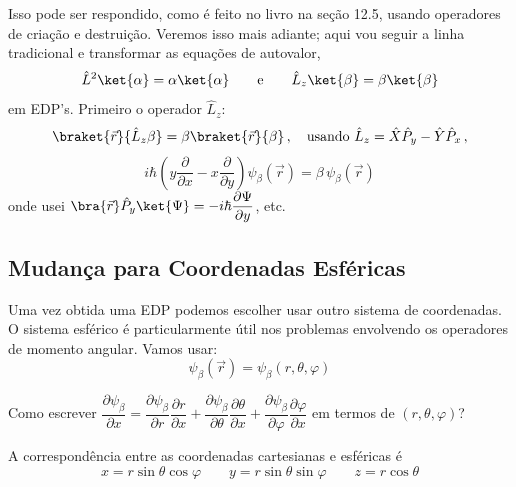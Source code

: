 Isso pode ser respondido, como é feito no livro na seção 12.5, usando operadores de criação e destruição. Veremos isso mais adiante; aqui vou seguir a linha tradicional e transformar as equações de autovalor,
\begin{equation}
    \hat{L}^2 \ket{\alpha} = \alpha \ket{\alpha} \qquad \text{e} \qquad \hat{L}_z \ket{\beta} = \beta \ket{\beta}
\label{eq:aula19_eq_autovalor_abstrata}
\end{equation}
em EDP's. Primeiro o operador $\hat{L}_z$:
\begin{equation}
    \braket{\vec{r}}{\hat{L}_z \beta} = \beta \braket{\vec{r}}{\beta} \,, \quad \text{usando } \hat{L}_z = \hat{X}\hat{P}_y - \hat{Y}\hat{P}_x \,,
\label{eq:aula19_Lz_braket}
\end{equation}
\begin{equation}
    i\hbar \left( y \frac{\partial}{\partial x} - x \frac{\partial}{\partial y} \right) \psi_\beta(\vec{r}) = \beta \, \psi_\beta(\vec{r})
\label{eq:aula19_Lz_EDP_cartesiana}
\end{equation}
onde usei $\bra{\vec{r}}\hat{P}_y\ket{\Psi} = -i\hbar \dfrac{\partial \Psi}{\partial y}$, etc.

\subsection*{Mudança para Coordenadas Esféricas}

Uma vez obtida uma EDP podemos escolher usar outro sistema de coordenadas. O sistema esférico é particularmente útil nos problemas envolvendo os operadores de momento angular. Vamos usar:
\begin{equation}
    \psi_\beta(\vec{r}) = \psi_\beta(r, \theta, \varphi)
\label{eq:aula19_psi_esferica}
\end{equation}

Como escrever $\dfrac{\partial \psi_\beta}{\partial x} = \dfrac{\partial \psi_\beta}{\partial r}\dfrac{\partial r}{\partial x} + \dfrac{\partial \psi_\beta}{\partial \theta}\dfrac{\partial \theta}{\partial x} + \dfrac{\partial \psi_\beta}{\partial \varphi}\dfrac{\partial \varphi}{\partial x}$ em termos de $(r,\theta,\varphi)$?

A correspondência entre as coordenadas cartesianas e esféricas é
\begin{equation}
    x = r \sin\theta \cos\varphi \qquad y = r \sin\theta \sin\varphi \qquad z = r \cos\theta
\label{eq:aula19_coordenadas_esfericas}
\end{equation}


